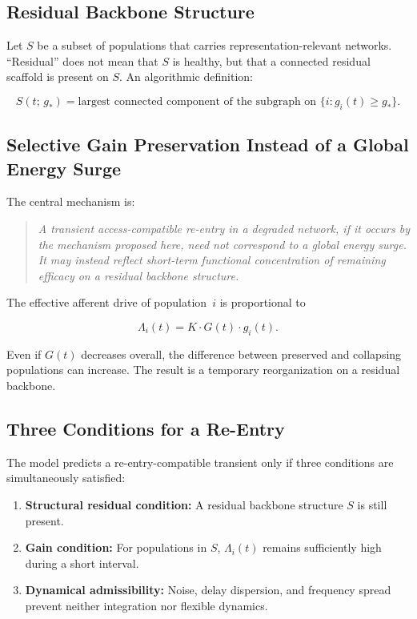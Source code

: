 ﻿\documentclass[11pt,a4paper]{article}
\theoremstyle{plain}
\theoremstyle{definition}
\theoremstyle{remark}
\begin{document}
\subsection{Residual Backbone Structure}

Let $S$ be a subset of populations that carries representation-relevant networks. ``Residual'' does not mean that $S$ is healthy, but that a connected residual scaffold is present on $S$. An algorithmic definition:

\begin{equation}
\label{eq:backbone}
S(t;\,g_*) = \text{largest connected component of the subgraph on } \{i : g_i(t) \geq g_*\}.
\end{equation}

\subsection{Selective Gain Preservation Instead of a Global Energy Surge}

The central mechanism is:

\begin{quote}
\itshape
A transient access-compatible re-entry in a degraded network, if it occurs by the mechanism proposed here, need not correspond to a global energy surge. It may instead reflect short-term functional concentration of remaining efficacy on a residual backbone structure.
\end{quote}

The effective afferent drive of population~$i$ is proportional to

\begin{equation}
\label{eq:Lambda}
\Lambda_i(t) = K \cdot G(t) \cdot g_i(t).
\end{equation}

Even if $G(t)$ decreases overall, the difference between preserved and collapsing populations can increase. The result is a temporary reorganization on a residual backbone.

\subsection{Three Conditions for a Re-Entry}

The model predicts a re-entry-compatible transient only if three conditions are simultaneously satisfied:

\begin{enumerate}
\item \textbf{Structural residual condition:} A residual backbone structure $S$ is still present.
\item \textbf{Gain condition:} For populations in $S$, $\Lambda_i(t)$ remains sufficiently high during a short interval.
\item \textbf{Dynamical admissibility:} Noise, delay dispersion, and frequency spread prevent neither integration nor flexible dynamics.
\end{enumerate}
\end{document}
